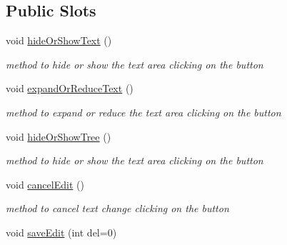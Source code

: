 \subsection*{Public Slots}
\begin{DoxyCompactItemize}
\item 
\hypertarget{classArea_a36014f76da996d4d3177fab5af44b42d}{void \hyperlink{classArea_a36014f76da996d4d3177fab5af44b42d}{hide\+Or\+Show\+Text} ()}\label{classArea_a36014f76da996d4d3177fab5af44b42d}

\begin{DoxyCompactList}\small\item\em method to hide or show the text area clicking on the button \end{DoxyCompactList}\item 
\hypertarget{classArea_a124912e5857e74fe14f65b15330a493b}{void \hyperlink{classArea_a124912e5857e74fe14f65b15330a493b}{expand\+Or\+Reduce\+Text} ()}\label{classArea_a124912e5857e74fe14f65b15330a493b}

\begin{DoxyCompactList}\small\item\em method to expand or reduce the text area clicking on the button \end{DoxyCompactList}\item 
\hypertarget{classArea_a2972e1d905e8e118d51903e4fccb3648}{void \hyperlink{classArea_a2972e1d905e8e118d51903e4fccb3648}{hide\+Or\+Show\+Tree} ()}\label{classArea_a2972e1d905e8e118d51903e4fccb3648}

\begin{DoxyCompactList}\small\item\em method to hide or show the text area clicking on the button \end{DoxyCompactList}\item 
\hypertarget{classArea_afbffb8cb88542aa9b70e1ef5fb00f47a}{void \hyperlink{classArea_afbffb8cb88542aa9b70e1ef5fb00f47a}{cancel\+Edit} ()}\label{classArea_afbffb8cb88542aa9b70e1ef5fb00f47a}

\begin{DoxyCompactList}\small\item\em method to cancel text change clicking on the button \end{DoxyCompactList}\item 
\hypertarget{classArea_a2f682bc0956a716b4997dd0c82111246}{void \hyperlink{classArea_a2f682bc0956a716b4997dd0c82111246}{save\+Edit} (int del=0)}\label{classArea_a2f682bc0956a716b4997dd0c82111246}


\end{DoxyCompactItemize}
